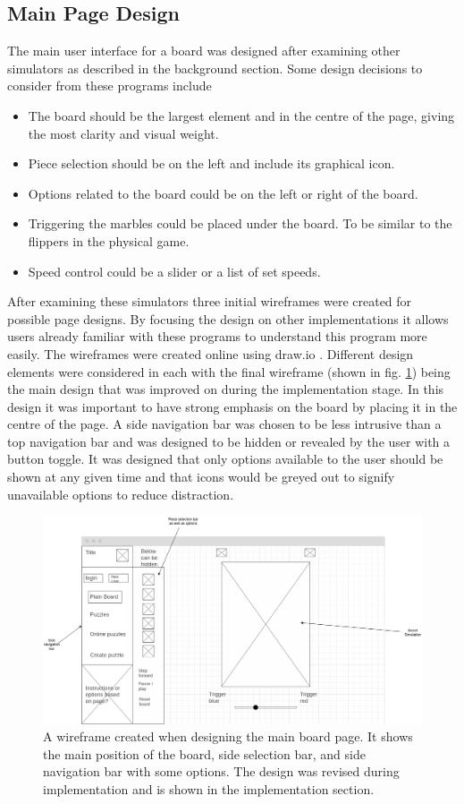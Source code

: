 \documentclass{l4proj}
\begin{document}
\subsection{Main Page Design}
The main user interface for a board was designed after examining other simulators as described in the background section. Some design decisions to consider from these programs include
\begin{itemize}
    \item The board should be the largest element and in the centre of the page, giving the most clarity and visual weight.
    \item Piece selection should be on the left and include its graphical icon.
    \item Options related to the board could be on the left or right of the board.
    \item Triggering the marbles could be placed under the board. To be similar to the flippers in the physical game.
    \item Speed control could be a slider or a list of set speeds.
\end{itemize}

After examining these simulators three initial wireframes were created for possible page designs. By focusing the design on other implementations it allows users already familiar with these programs to understand this program more easily. The wireframes were created online using draw.io \citep{noauthor_flowchart_nodate}. Different design elements were considered in each with the final wireframe (shown in fig. \ref{fig:wireframe}) being the main design that was improved on during the implementation stage. In this design it was important to have strong emphasis on the board by placing it in the centre of the page. A side navigation bar was chosen to be less intrusive than a top navigation bar and was designed to be hidden or revealed by the user with a button toggle. It was designed that only options available to the user should be shown at any given time and that icons would be greyed out to signify unavailable options to reduce distraction.


\begin{figure}
    \centering
    \includegraphics[width=0.8\linewidth]{images/wireframe.png}
    \caption{A wireframe created when designing the main board page. It shows the main position of the board, side selection bar, and side navigation bar with some options. The design was revised during implementation and is shown in the implementation section.}
    \label{fig:wireframe}
\end{figure}
\end{document}
